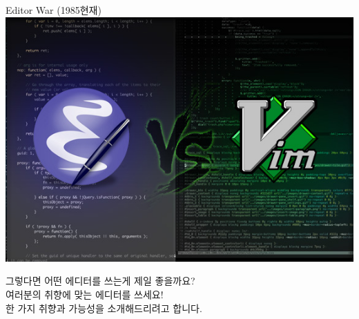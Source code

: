 \documentclass{beamer}
\begin{document}
\begin{frame}[plain]{Editor War (1985\tat{}현재)}
  \centering\includegraphics[width=0.8\linewidth]{figures/emacs-vs-vim}
\end{frame}

\begin{frame}[plain]{}
  \Large\centering
  그렇다면 어떤 에디터를 쓰는게 제일 좋을까요?\\\pause\vpad
  \large
  여러분의 취향에 맞는 에디터를 쓰세요!\\\pause\vpad
  \alert{한 가지 취향}과 \alert{가능성}을 소개해드리려고 합니다.
\end{frame}
\end{document}
